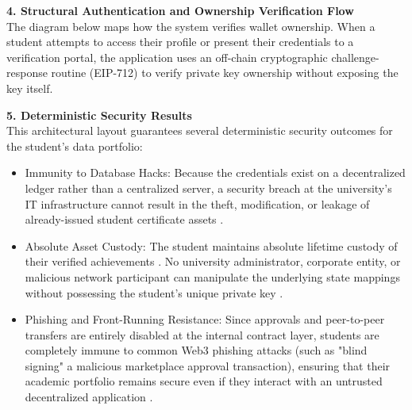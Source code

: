 \textbf{4. Structural Authentication and Ownership Verification Flow}\\

The diagram below maps how the system verifies wallet ownership. When a student attempts to access their profile or present their credentials to a verification portal, the application uses an off-chain cryptographic challenge-response routine (EIP-712) to verify private key ownership without exposing the key itself.




\textbf{5. Deterministic Security Results}\\

This architectural layout guarantees several deterministic security outcomes for the student's data portfolio:

\begin{itemize}

    \item Immunity to Database Hacks: Because the credentials exist on a decentralized ledger rather than a centralized server, a security breach at the university's IT infrastructure cannot result in the theft, modification, or leakage of already-issued student certificate assets \cite{khati2023studentcert}.

    \item Absolute Asset Custody: The student maintains absolute lifetime custody of their verified achievements \cite{kumutha2021blockchainacdaemic}. No university administrator, corporate entity, or malicious network participant can manipulate the underlying state mappings without possessing the student's unique private key \cite{nfterc721web}.

    \item Phishing and Front-Running Resistance: Since approvals and peer-to-peer transfers are entirely disabled at the internal contract layer, students are completely immune to common Web3 phishing attacks (such as "blind signing" a malicious marketplace approval transaction), ensuring that their academic portfolio remains secure even if they interact with an untrusted decentralized application \cite{blockchainineducation}.

\end{itemize}